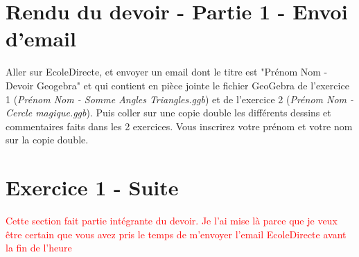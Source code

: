 \documentclass[answers]{exam}
\begin{document}
\section*{Rendu du devoir - Partie 1 - Envoi d'email}

\begin{questions}

\question Aller sur EcoleDirecte, et envoyer un email dont le titre est "Prénom Nom - Devoir Geogebra" et qui contient en pièce jointe le fichier GeoGebra de l'exercice 1 (\textit{Prénom Nom - Somme Angles Triangles.ggb}) et de l'exercice 2 (\textit{Prénom Nom - Cercle magique.ggb}). 
\question Puis coller sur une copie double les différents dessins et commentaires faits dans les 2 exercices. Vous inscrirez votre prénom et votre nom sur la copie double.
\end{questions}

\section*{Exercice 1 - Suite}

\textcolor{red}{Cette section fait partie intégrante du devoir. Je l'ai mise là parce que je veux être certain que vous avez pris le temps de m'envoyer l'email EcoleDirecte avant la fin de l'heure}
\end{document}
